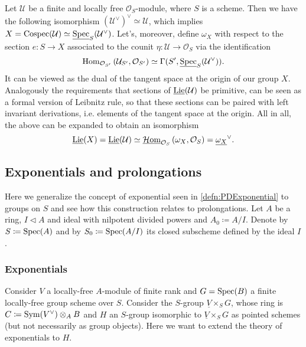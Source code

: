 \begin{rem}\label{LieDualConormalSheaf}
	Let $\mathcal{U}$ be a finite and locally free $\mathcal{O}_{ S }$-module,
	where $S$ is a scheme.
	Then we have the following isomorphism $(\mathcal{U}^\vee)^\vee \simeq \mathcal{U}$,
	which implies $X = \operatorname{Cospec}(\mathcal{U}) \simeq 
	\underline{\operatorname{Spec}}_S(\mathcal{U}^\vee)$.
	Let's, moreover, define $\omega_X$ with respect to the section $e\colon S \to X$
	associated to the counit $\eta\colon \mathcal{U} \to \mathcal{O}_{ S }$
	via the identification
	\begin{equation*}
		\operatorname{Hom}_{ \mathcal{O}_{ S' }}
		\left( \mathcal{U}_{S'}, \mathcal{O}_{ S' } \right) 
		\simeq
		\Gamma(S', \underline{\operatorname{Spec}}_S(\mathcal{U}^\vee))
	.\end{equation*}
	It can be viewed as the dual of the tangent space at the origin
	of our group $X$.
	Analogously the requirements that sections of $\underline{\operatorname{Lie}}(\mathcal{U})$
	be primitive, can be seen as a formal version of Leibnitz rule,
	so that these sections can be paired with left invariant derivations, i.e$.$
	elements of the tangent space at the origin.
	All in all, the above can be expanded to obtain an isomorphism
	\begin{equation*}
		\underline{\operatorname{Lie}}(X) =
		\underline{\operatorname{Lie}}(\mathcal{U}) \simeq
		\underline{\mathcal{H}\mathrm{om}}_{ \mathcal{O}_{ S } } 
		\left(\omega_X , \mathcal{O}_{ S } \right) =
		\underline{\omega_X}^\vee
	.\end{equation*}
\end{rem}


\subsection{Exponentials and prolongations}
Here we generalize the concept of exponential seen in \cref{defn:PDExponential}
to groups on $S$ and see how this construction relates to prolongations.
Let $A$ be a ring, $I \triangleleft A$ and ideal with nilpotent
divided powers and $A_0 \coloneqq A/I$.
Denote by $S \coloneqq \operatorname{Spec}(A)$
and by $S_0 \coloneqq \operatorname{Spec}(A/I)$ its closed
subscheme defined by the ideal $I$.



\subsubsection{Exponentials}
Consider $V$ a locally-free $A$-module of finite rank
and $G = \operatorname{Spec}(B)$ a finite locally-free 
group scheme over $S$.
Consider the $S$-group $\underline{V} \times_{ S } G$, whose ring is
$C \coloneqq \operatorname{Sym}(V^\vee) \otimes_A B$ and $H$ an $S$-group isomorphic
to $\underline{V} \times_{ S } G$ as pointed schemes (but not necessarily
as group objects).
Here we want to extend the theory of exponentials to $H$.


